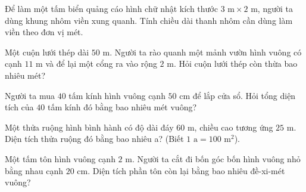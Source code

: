 \begin{ex} %
Để làm một tấm biển quảng cáo hình chữ nhật kích thước $3\text{ m} \times 2\text{ m}$, người ta dùng khung nhôm viền xung quanh. Tính chiều dài thanh nhôm cần dùng làm viền theo đơn vị mét.
\end{ex}

\begin{ex} %
Một cuộn lưới thép dài $50\text{ m}$. Người ta rào quanh một mảnh vườn hình vuông có cạnh $11\text{ m}$ và để lại một cổng ra vào rộng $2\text{ m}$. Hỏi cuộn lưới thép còn thừa bao nhiêu mét?
\end{ex}

\begin{ex} %
Người ta mua $40$ tấm kính hình vuông cạnh $50\text{ cm}$ để lắp cửa sổ. Hỏi tổng diện tích của $40$ tấm kính đó bằng bao nhiêu mét vuông?
\end{ex}

\begin{ex} %
Một thửa ruộng hình bình hành có độ dài đáy $60\text{ m}$, chiều cao tương ứng $25\text{ m}$. Diện tích thửa ruộng đó bằng bao nhiêu a? (Biết $1\text{ a} = 100\text{ m}^2$).
\end{ex}

\begin{ex} %
Một tấm tôn hình vuông cạnh $2\text{ m}$. Người ta cắt đi bốn góc bốn hình vuông nhỏ bằng nhau cạnh $20\text{ cm}$. Diện tích phần tôn còn lại bằng bao nhiêu đề-xi-mét vuông?
\end{ex}
